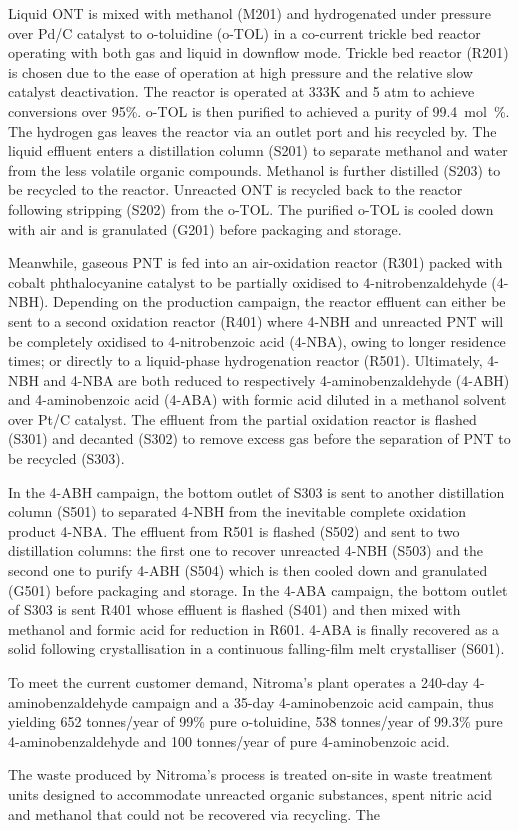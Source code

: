 Liquid ONT is mixed with methanol (M201) and hydrogenated under pressure over Pd/C catalyst to o-toluidine (o-TOL) in a co-current trickle bed reactor operating with both gas and liquid in downflow mode. Trickle bed reactor (R201) is chosen due to the ease of operation at high pressure and the relative slow catalyst deactivation. The reactor is operated at 333K and 5 atm to achieve conversions over 95\%. o-TOL is then purified to achieved a purity of \SI{99.4}{mol\percent}. The hydrogen gas leaves the reactor via an outlet port and his recycled by. The liquid effluent enters a distillation column (S201) to separate methanol and water from the less volatile organic compounds. Methanol is further distilled (S203) to be recycled to the reactor. Unreacted ONT is recycled back to the reactor following stripping (S202) from the o-TOL. The purified o-TOL is cooled down with air and is granulated (G201) before packaging and storage.

Meanwhile, gaseous PNT is fed into an air-oxidation reactor (R301) packed with cobalt phthalocyanine catalyst to be partially oxidised to 4-nitrobenzaldehyde (4-NBH). Depending on the production campaign, the reactor effluent can either be sent to a second oxidation reactor (R401) where 4-NBH and unreacted PNT will be completely oxidised to 4-nitrobenzoic acid (4-NBA), owing to longer residence times; or directly to a liquid-phase hydrogenation reactor (R501). Ultimately, 4-NBH and 4-NBA are both reduced to respectively 4-aminobenzaldehyde (4-ABH) and 4-aminobenzoic acid (4-ABA) with formic acid diluted in a methanol solvent over Pt/C catalyst. The effluent from the partial oxidation reactor is flashed (S301) and decanted (S302) to remove excess gas before the separation of PNT to be recycled (S303). 

In the 4-ABH campaign, the bottom outlet of S303 is sent to another distillation column (S501) to separated 4-NBH from the inevitable complete oxidation product 4-NBA. The effluent from R501 is flashed (S502) and sent to two distillation columns: the first one to recover unreacted 4-NBH (S503) and the second one to purify 4-ABH (S504) which is then cooled down and granulated (G501) before packaging and storage.  
In the 4-ABA campaign, the bottom outlet of S303 is sent R401 whose effluent is flashed (S401) and then mixed with methanol and formic acid for reduction in R601. 4-ABA is finally recovered as a solid following  crystallisation in a continuous falling-film melt crystalliser (S601).

To meet the current customer demand, Nitroma's plant operates a 240-day 4-aminobenzaldehyde campaign and a 35-day 4-aminobenzoic acid campain, thus yielding 652 tonnes/year of 99\% pure o-toluidine, 538 tonnes/year of 99.3\% pure 4-aminobenzaldehyde and 100 tonnes/year of pure 4-aminobenzoic acid.

The waste produced by Nitroma's process is treated on-site in waste treatment units designed to accommodate unreacted organic substances, spent nitric acid and methanol that could not be recovered via recycling. The 
